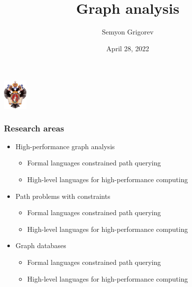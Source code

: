 \documentclass[xcolor=table,aspectratio=169]{beamer}
\title[Graph analysis]{Graph analysis}
\institute[PL\&T@SPbSU]{
Saint Petersburg State University
}
\author[Semyon Grigorev]{Semyon Grigorev}
\date{April 28, 2022}
\begin{document}
{
\begin{frame}[fragile]
  \begin{table}
  \centering
  \includegraphics[height=1.5cm]{pictures/SPbGU_Logo.png}
  \end{table}
  \titlepage
\end{frame}
}

\begin{frame}[fragile]
  \frametitle{Research areas}  
  \begin{itemize}
    \item High-performance graph analysis
      \begin{itemize}
        \item Formal languages constrained path querying        
        \item High-level languages for high-performance computing
      \end{itemize}
    \item Path problems with constraints
    \begin{itemize}
      \item Formal languages constrained path querying        
      \item High-level languages for high-performance computing
    \end{itemize}
    \item Graph databases
      \begin{itemize}
        \item Formal languages constrained path querying        
        \item High-level languages for high-performance computing
      \end{itemize}
    \end{itemize}
\end{frame}
\end{document}
